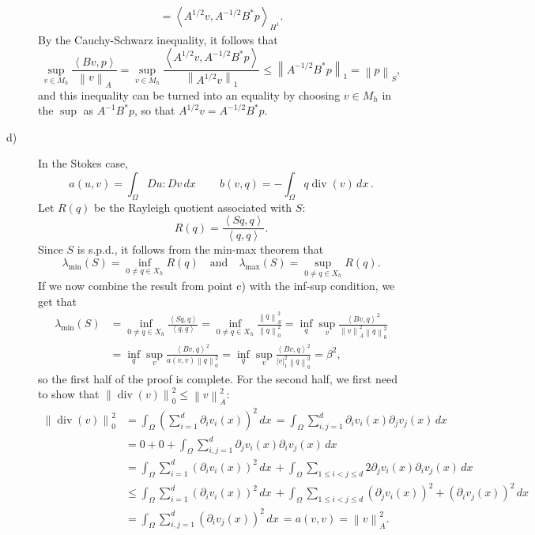 \documentclass[a4paper]{article}
\DeclareMathOperator{\diver}{div}
\newcommand{\dx}{\, dx \,}
\newcommand{\seminorm}[1]{\left\lvert #1 \right\rvert}
\newcommand{\norm}[1]{\left\lVert #1 \right\rVert}
\newcommand{\dpair}[1]{\left\langle #1 \right\rangle}
\begin{document}
\begin{description}
\begin{gather*}
	= \dpair{A^{1/2}v,A^{-1/2}B^*p}_{H^1}.
	\end{gather*}
	By the Cauchy-Schwarz inequality, it follows that
	\[
	\sup_{v \in M_h} \frac{\dpair{Bv,p}}{\norm{v}_A}
	= \sup_{v \in M_h} \frac{\dpair{A^{1/2}v,A^{-1/2}B^*p}}{\norm{A^{1/2}v}_1}
	\leq \norm{A^{-1/2}B^*p}_1
	= \norm{p}_S,
	\]
	and this inequality can be turned into an equality by choosing $v \in M_h$
	in the $\sup$ as $A^{-1}B^*p$, so that $A^{1/2}v = A^{-1/2}B^*p$.
\item[d)] In the Stokes case,
	\[
	a(u,v) = \int_\Omega Du : Dv \dx \qquad
	b(v,q) = -\int_\Omega q \diver(v) \dx.
	\]
	Let $R(q)$ be the Rayleigh quotient associated with $S$:
	\[
	R(q) = \frac{\dpair{Sq,q}}{\dpair{q,q}}.
	\]
	Since $S$ is s.p.d., it follows from the min-max theorem that
	\[
	\lambda_\text{min}(S) = \inf_{0 \neq q \in X_h} R(q)
	\quad \text{and} \quad
	\lambda_\text{max}(S) = \sup_{0 \neq q \in X_h} R(q).
	\]
	If we now combine the result from point c) with the inf-sup condition, we get that
	\begin{align*}
	\lambda_\text{min}(S)
&	= \inf_{0 \neq q \in X_h} \frac{\dpair{Sq,q}}{\dpair{q,q}}
	= \inf_{0 \neq q \in X_h} \frac{\norm{q}_S^2}{\norm{q}_0^2}
	= \inf_{q} \sup_{v} \frac{\dpair{Bv,q}^2}{\norm{v}_A^2 \norm{q}_0^2} \\
&	= \inf_{q} \sup_{v} \frac{\dpair{Bv,q}^2}{a(v,v) \norm{q}_0^2}
	= \inf_{q} \sup_{v} \frac{\dpair{Bv,q}^2}{\seminorm{v}_1^2 \norm{q}_0^2}
	= \beta^2,
	\end{align*}
	so the first half of the proof is complete. For the second half,
	we first need to show that $\norm{\diver(v)}_0^2 \leq \norm{v}_A^2$:
	\begin{align*}
	\norm{\diver(v)}_0^2
&	= \int_\Omega \left( \sum_{i=1}^d \partial_i v_i(x) \right)^2 \dx
	= \int_\Omega \sum_{i,j=1}^d \partial_i v_i(x) \partial_j v_j(x) \dx \\
&	= 0 + 0 + \int_\Omega \sum_{i,j=1}^d \partial_j v_i(x) \partial_i v_j(x) \dx \\
&	= \int_\Omega \sum_{i=1}^d (\partial_i v_i(x))^2 \dx
		+ \int_\Omega \sum_{1 \leq i < j \leq d}
		2 \partial_j v_i(x) \partial_i v_j(x) \dx \\
&	\leq \int_\Omega \sum_{i=1}^d (\partial_i v_i(x))^2 \dx
		+ \int_\Omega \sum_{1 \leq i < j \leq d}
		(\partial_j v_i(x))^2 + (\partial_i v_j(x))^2 \dx \\
&	= \int_\Omega \sum_{i,j=1}^d (\partial_i v_j(x))^2 \dx
	= a(v,v)
	= \norm{v}_A^2.
	\end{align*}

\end{description}
\end{document}
